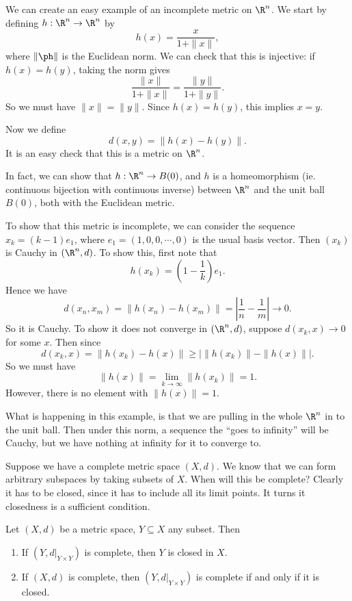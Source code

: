 \documentclass[a4paper]{article}
\begin{document}
\begin{eg}
  We can create an easy example of an incomplete metric on $\R^n$. We start by defining $h: \R^n \to \R^n$ by
  \[
    h(x) = \frac{x}{1 + \|x\|},
  \]
  where $\|\ph\|$ is the Euclidean norm. We can check that this is injective: if $h(x) = h(y)$, taking the norm gives
  \[
    \frac{\|x\|}{1 + \|x\|} = \frac{\|y\|}{ 1 + \|y\|}.
  \]
  So we must have $\|x\| = \|y\|$. Since $h(x) = h(y)$, this implies $x = y$.

  Now we define
  \[
    d(x, y) = \|h(x) - h(y)\|.
  \]
  It is an easy check that this is a metric on $\R^n$.

  In fact, we can show that $h: \R^n \to B(0)$, and $h$ is a homeomorphism (ie. continuous bijection with continuous inverse) between $\R^n$ and the unit ball $B(0)$, both with the Euclidean metric.

  To show that this metric is incomplete, we can consider the sequence $x_k = (k - 1) e_1$, where $e_1 = (1, 0, 0, \cdots, 0)$ is the usual basis vector. Then $(x_k)$ is Cauchy in $(\R^n, d)$. To show this, first note that
  \[
    h(x_k) = \left(1 - \frac{1}{k}\right) e_1.
  \]
  Hence we have
  \[
    d(x_n, x_m) = \|h(x_n) - h(x_m)\| = \left|\frac{1}{n} - \frac{1}{m}\right| \to 0.
  \]
  So it is Cauchy. To show it does not converge in $(\R^n, d)$, suppose $d(x_k, x) \to 0$ for some $x$. Then since
  \[
    d(x_k, x) = \|h(x_k) - h(x)\| \geq \big| \|h(x_k)\| - \|h(x)\|\big|.
  \]
  So we must have
  \[
    \|h(x)\| = \lim_{k \to \infty} \|h(x_k)\| = 1.
  \]
  However, there is no element with $\|h(x)\| = 1$.
\end{eg}
What is happening in this example, is that we are pulling in the whole $\R^n$ in to the unit ball. Then under this norm, a sequence the ``goes to infinity'' will be Cauchy, but we have nothing at infinity for it to converge to.

Suppose we have a complete metric space $(X, d)$. We know that we can form arbitrary subspaces by taking subsets of $X$. When will this be complete? Clearly it has to be closed, since it has to include all its limit points. It turns it closedness is a sufficient condition.
\begin{thm}
  Let $(X, d)$ be a metric space, $Y \subseteq X$ any subset. Then
  \begin{enumerate}
    \item If $(Y, d|_{Y\times Y})$ is complete, then $Y$ is closed in $X$.
    \item If $(X, d)$ is complete, then $(Y, d|_{Y\times Y})$ is complete if and only if it is closed.
  \end{enumerate}
\end{thm}
\end{document}
